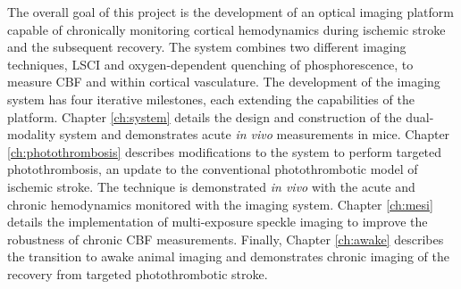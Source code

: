 The overall goal of this project is the development of an optical imaging platform capable of chronically monitoring cortical hemodynamics during ischemic stroke and the subsequent recovery. The system combines two different imaging techniques, LSCI and oxygen-dependent quenching of phosphorescence, to measure CBF and  within cortical vasculature. The development of the imaging system has four iterative milestones, each extending the capabilities of the platform. Chapter \ref{ch:system} details the design and construction of the dual-modality system and demonstrates acute \textit{in vivo} measurements in mice. Chapter \ref{ch:photothrombosis} describes modifications to the system to perform targeted photothrombosis, an update to the conventional photothrombotic model of ischemic stroke. The technique is demonstrated \textit{in vivo} with the acute and chronic hemodynamics monitored with the imaging system. Chapter \ref{ch:mesi} details the implementation of multi-exposure speckle imaging to improve the robustness of chronic CBF measurements. Finally, Chapter \ref{ch:awake} describes the transition to awake animal imaging and demonstrates chronic imaging of the recovery from targeted photothrombotic stroke.




